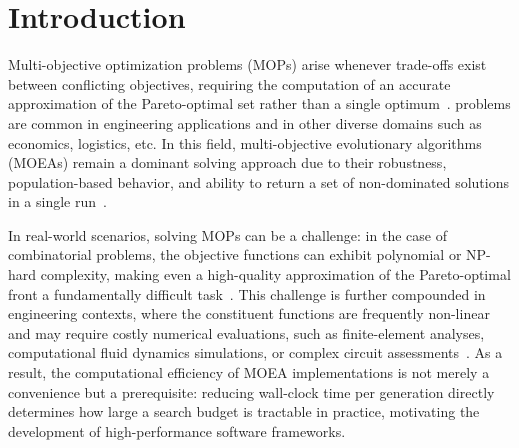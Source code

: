 \documentclass[final,5p,times,twocolumn]{elsarticle}
\begin{document}
\section{Introduction} \label{sec:intro}

Multi-objective optimization problems (MOPs) arise whenever trade-offs exist between conflicting objectives, requiring the computation of an accurate approximation of the Pareto-optimal set rather than a single optimum~\cite{deb01}.  problems are common in engineering applications and in other diverse domains such as  economics, logistics, etc. In this field, multi-objective evolutionary algorithms (MOEAs) remain a dominant solving approach due to their robustness, population-based behavior, and ability to return a set of non-dominated solutions in a single run~\cite{CLV07}.

In real-world scenarios, solving MOPs can be a challenge: in the case of combinatorial problems, the objective functions can exhibit polynomial or NP-hard complexity, making even a high-quality approximation of the Pareto-optimal front a fundamentally difficult task~\cite{CLV07,deb01}. This challenge is further compounded in engineering contexts, where the constituent functions are frequently non-linear and may require costly numerical evaluations, such as finite-element analyses, computational fluid dynamics simulations, or complex circuit assessments~\cite{ZGM23}. As a result, the computational efficiency of MOEA implementations is not merely a convenience but a prerequisite: reducing wall-clock time per generation directly determines how large a search budget is tractable in practice, motivating the development of high-performance software frameworks.
\end{document}
